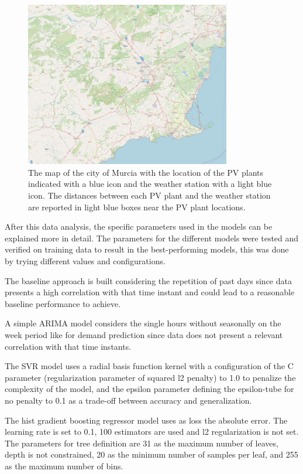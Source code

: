 \begin{figure}[H]
\centering
\includegraphics[width=0.8\textwidth]{images/production/pv_plants_map}
\caption{The map of the city of Murcia with the location of the PV plants indicated with a blue icon and the weather station with a light blue icon. The distances between each PV plant and the weather station are reported in light blue boxes near the PV plant locations.}
\label{fig:pvplantsmap}
\end{figure}

After this data analysis, the specific parameters used in the models can be explained more in detail.
The parameters for the different models were tested and verified on training data to result in the best-performing models, this was done by trying different values and configurations.

The baseline approach is built considering the repetition of past days since data presents a high correlation with that time instant and could lead to a reasonable baseline performance to achieve.

A simple ARIMA model considers the single hours without seasonally on the week period like for demand prediction since data does not present a relevant correlation with that time instants.

The SVR model uses a radial basis function kernel with a configuration of the C parameter (regularization parameter of squared l2 penalty) to 1.0 to penalize the complexity of the model, and the epsilon parameter defining the epsilon-tube for no penalty to 0.1 as a trade-off between accuracy and generalization.

The hist gradient boosting regressor model uses as loss the absolute error.
The learning rate is set to 0.1, 100 estimators are used and l2 regularization is not set.
The parameters for tree definition are 31 as the maximum number of leaves, depth is not constrained, 20 as the minimum number of samples per leaf, and 255 as the maximum number of bins.

